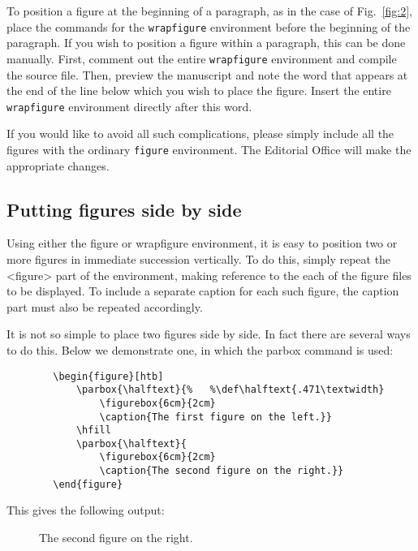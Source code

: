 \documentclass[seceq]{ptptex}
\def\BS{\ttfamily \symbol{"5C}}        %
\begin{document}
To position a figure at the beginning of a paragraph, as
in the case of Fig.~\ref{fig:2}, place 
the commands for the \verb+wrapfigure+ environment before the 
beginning of the paragraph. If you wish to position a figure within 
a paragraph, this can be done manually. First, comment out the entire
\verb+wrapfigure+ environment and compile the source file.
Then, preview the manuscript and note the word that appears
at the end of the line below which you wish to place the 
figure. Insert the entire \verb+wrapfigure+ environment 
directly after this word. 

If you would like to avoid all such complications, please simply 
include all the figures with the ordinary \verb+figure+ environment. 
The Editorial Office will make the appropriate changes.

\subsection{Putting figures side by side}

Using either the {\ttfamily  figure} or {\ttfamily  wrapfigure} environment,
it is easy to position two or more figures in immediate succession vertically. 
To do this, simply repeat the {\ttfamily  <figure>} part of the environment,
making reference to the each of the figure files to be displayed. 
To include a separate caption for each such figure, the 
{\ttfamily  \BS caption} part must also
be repeated accordingly.

It is not so simple to place two figures side by side. In fact 
there are several ways to do this. Below we demonstrate one, in which the 
{\ttfamily  \BS parbox} command is used:
\begin{verbatim}
        \begin{figure}[htb]
            \parbox{\halftext}{%   %\def\halftext{.471\textwidth}
                \figurebox{6cm}{2cm}
                \caption{The first figure on the left.}}
            \hfill
            \parbox{\halftext}{
                \figurebox{6cm}{2cm}
                \caption{The second figure on the right.}}
        \end{figure}
\end{verbatim}
This gives the following output:
\begin{figure}[htb]
 \parbox{\halftext}{\figurebox{6cm}{2cm}
                \caption{The first figure on the left.}}
 \hfill
 \parbox{\halftext}{\figurebox{6cm}{2cm}
                \caption{The second figure on the right.}}
\end{figure}
\end{document}
